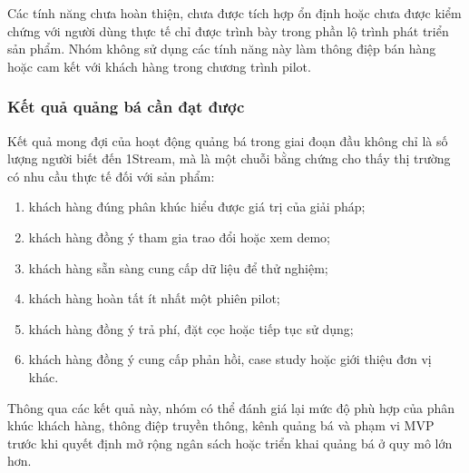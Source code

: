 Các tính năng chưa hoàn thiện, chưa được tích hợp ổn định hoặc chưa được kiểm chứng với người dùng thực tế chỉ được trình bày trong phần lộ trình phát triển sản phẩm. Nhóm không sử dụng các tính năng này làm thông điệp bán hàng hoặc cam kết với khách hàng trong chương trình pilot.

\subsubsection{Kết quả quảng bá cần đạt được}

Kết quả mong đợi của hoạt động quảng bá trong giai đoạn đầu không chỉ là số lượng người biết đến 1Stream, mà là một chuỗi bằng chứng cho thấy thị trường có nhu cầu thực tế đối với sản phẩm:

\begin{enumerate}
    \item khách hàng đúng phân khúc hiểu được giá trị của giải pháp;
    \item khách hàng đồng ý tham gia trao đổi hoặc xem demo;
    \item khách hàng sẵn sàng cung cấp dữ liệu để thử nghiệm;
    \item khách hàng hoàn tất ít nhất một phiên pilot;
    \item khách hàng đồng ý trả phí, đặt cọc hoặc tiếp tục sử dụng;
    \item khách hàng đồng ý cung cấp phản hồi, case study hoặc giới thiệu đơn vị khác.
\end{enumerate}

Thông qua các kết quả này, nhóm có thể đánh giá lại mức độ phù hợp của phân khúc khách hàng, thông điệp truyền thông, kênh quảng bá và phạm vi MVP trước khi quyết định mở rộng ngân sách hoặc triển khai quảng bá ở quy mô lớn hơn.